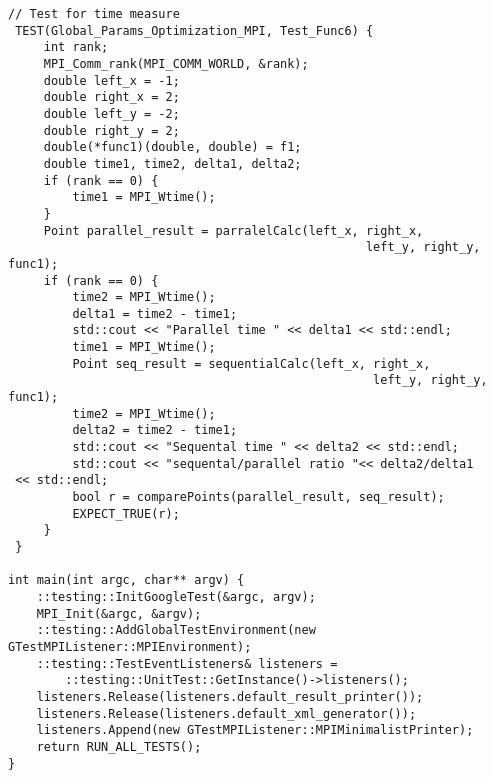 \documentclass{report}
\begin{document}
\begin{lstlisting}
// Test for time measure
 TEST(Global_Params_Optimization_MPI, Test_Func6) {
     int rank;
     MPI_Comm_rank(MPI_COMM_WORLD, &rank);
     double left_x = -1;
     double right_x = 2;
     double left_y = -2;
     double right_y = 2;
     double(*func1)(double, double) = f1;
     double time1, time2, delta1, delta2;
     if (rank == 0) {
         time1 = MPI_Wtime();
     }
     Point parallel_result = parralelCalc(left_x, right_x,
                                                  left_y, right_y, func1);
     if (rank == 0) {
         time2 = MPI_Wtime();
         delta1 = time2 - time1;
         std::cout << "Parallel time " << delta1 << std::endl;
         time1 = MPI_Wtime();
         Point seq_result = sequentialCalc(left_x, right_x,
                                                   left_y, right_y, func1);
         time2 = MPI_Wtime();
         delta2 = time2 - time1;
         std::cout << "Sequental time " << delta2 << std::endl;
         std::cout << "sequental/parallel ratio "<< delta2/delta1
 << std::endl;
         bool r = comparePoints(parallel_result, seq_result);
         EXPECT_TRUE(r);
     }
 }

int main(int argc, char** argv) {
    ::testing::InitGoogleTest(&argc, argv);
    MPI_Init(&argc, &argv);
    ::testing::AddGlobalTestEnvironment(new GTestMPIListener::MPIEnvironment);
    ::testing::TestEventListeners& listeners =
        ::testing::UnitTest::GetInstance()->listeners();
    listeners.Release(listeners.default_result_printer());
    listeners.Release(listeners.default_xml_generator());
    listeners.Append(new GTestMPIListener::MPIMinimalistPrinter);
    return RUN_ALL_TESTS();
}
\end{lstlisting}
\end{document}
